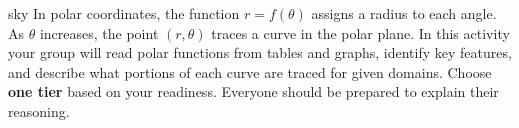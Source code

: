 \documentclass[10pt]{article}
\begin{document}
\namepartnerperiod

\vspace{0.08in}

\begin{scenariobox}{sky}
In polar coordinates, the function $r = f(\theta)$ assigns a radius to each angle.
As $\theta$ increases, the point $(r, \theta)$ traces a curve in the polar plane.
In this activity your group will read polar functions from tables and graphs,
identify key features, and describe what portions of each curve are traced for
given domains. Choose \textbf{one tier} based on your readiness. Everyone should
be prepared to explain their reasoning.
\end{scenariobox}

\vspace{0.08in}
\end{document}

